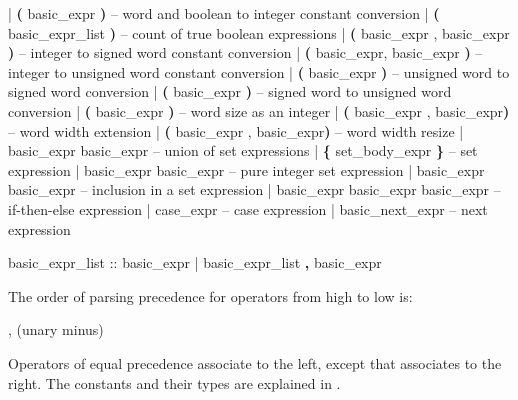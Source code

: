 \begin{Grammar}
    |  \textbf{(} basic_expr \textbf{)}          -- word and boolean to integer constant conversion
    |  \textbf{(} basic_expr_list \textbf{)}     -- count of true boolean expressions
    |  \textbf{(} basic_expr , basic_expr \textbf{)}
                                    -- integer to signed word constant conversion
    |  \textbf{(} basic_expr, basic_expr \textbf{)}
                                    -- integer to unsigned word constant conversion
    |  \textbf{(} basic_expr \textbf{)}         -- unsigned word to signed word conversion
    |  \textbf{(} basic_expr \textbf{)}       -- signed word to unsigned word conversion
    |  \textbf{(} basic_expr \textbf{)}         -- word size as an integer
    |  \textbf{(} basic_expr , basic_expr\textbf{)}
                                    -- word width extension
    |  \textbf{(} basic_expr , basic_expr\textbf{)}
                                    -- word width resize
    | basic_expr  basic_expr   -- union of set expressions
    | \textbf{\{} set_body_expr \textbf{\}}             -- set expression
    | basic_expr  basic_expr      -- pure integer set expression
    | basic_expr  basic_expr      -- inclusion in a set expression
    | basic_expr  basic_expr \operator{:} basic_expr
                                    -- if-then-else expression
    | case_expr                     -- case expression
    | basic_next_expr               -- next expression

basic_expr_list ::
      basic_expr
    | basic_expr_list \textbf{,} basic_expr
\end{Grammar}

\noindent The order of parsing precedence for operators from high to
low is:
%
\begin{Grammar}
      \operator{[ ]}, \operator{[ : ]}
      \operator{!}
      \operator{-} (unary minus)
      \operator{::}
      \operator{*}   \operator{/}   
      \operator{+}   \operator{-}
      \operator{<<}   \operator{>>}
      \operator{=}   \operator{!=}   \operator{<}   \operator{>}   \operator{<=}   \operator{>=}
      \operator{\&}
      \operator{|}      
      \itebullet
      \operator{<->}
      \operator{->}
\end{Grammar}
%
Operators of equal precedence associate to the left, except \operator{->}
that associates to the right.
%
The constants and their types are explained in .

